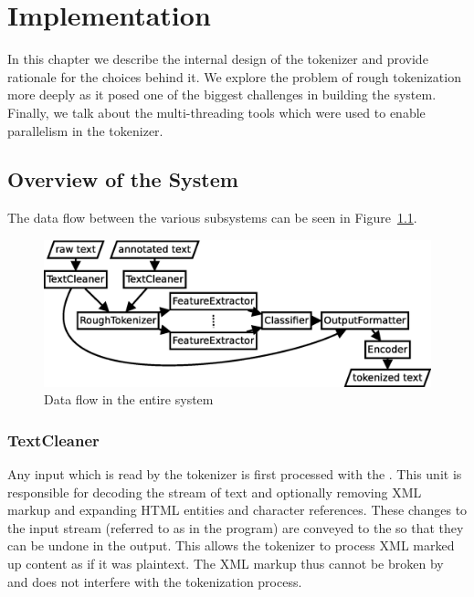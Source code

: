\chapter{Implementation}
\label{chap:impl}

In this chapter we describe the internal design of the tokenizer and provide
rationale for the choices behind it. We explore the problem of rough
tokenization more deeply as it posed one of the biggest challenges in building
the system. Finally, we talk about the multi-threading tools which were used to
enable parallelism in the tokenizer.


\section{Overview of the System}
\label{sec:impl-overview}

The data flow between the various subsystems can be seen in
Figure~\ref{fig:all-parts}.

\begin{figure}
  \includegraphics[width=\textwidth]{img/all-parts.eps}
  \caption{Data flow in the entire system}
  \label{fig:all-parts}
\end{figure}

\subsection{TextCleaner}
\label{ssec:impl-overview-textcleaner}

Any input which is read by the tokenizer is first processed with the
. This unit is responsible for decoding the stream of text
and optionally removing XML markup and expanding HTML entities and character
references. These changes to the input stream (referred to as 
in the program) are conveyed to the  so that they can be
undone in the output. This allows the tokenizer to process XML marked up
content as if it was plaintext. The XML markup thus cannot be broken by and
does not interfere with the tokenization process.

